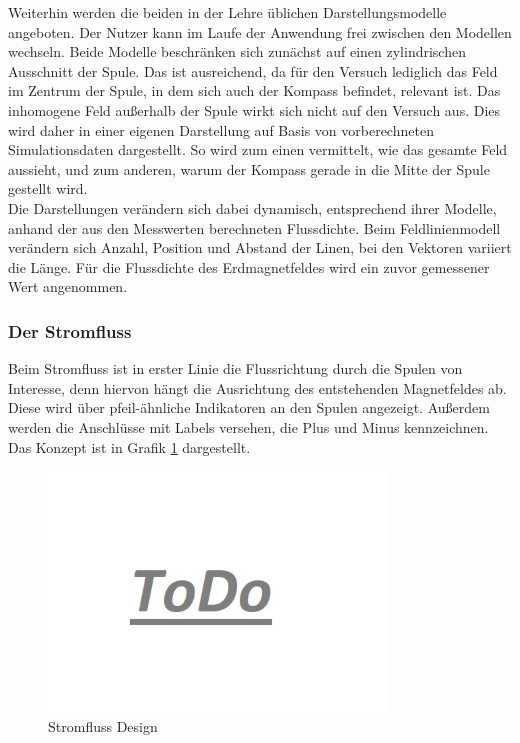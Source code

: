 Weiterhin werden die beiden in der Lehre üblichen Darstellungsmodelle angeboten. Der Nutzer kann im Laufe der Anwendung frei zwischen den Modellen wechseln. Beide Modelle beschränken sich zunächst auf einen zylindrischen Ausschnitt der Spule. Das ist ausreichend, da für den Versuch lediglich das Feld im Zentrum der Spule, in dem sich auch der Kompass befindet, relevant ist. Das inhomogene Feld außerhalb der Spule wirkt sich nicht auf den Versuch aus. Dies wird daher in einer eigenen Darstellung auf Basis von vorberechneten Simulationsdaten dargestellt. So wird zum einen vermittelt, wie das gesamte Feld aussieht, und zum anderen, warum der Kompass gerade in die Mitte der Spule gestellt wird.\\

Die Darstellungen verändern sich dabei dynamisch, entsprechend ihrer Modelle, anhand der aus den Messwerten berechneten Flussdichte. Beim Feldlinienmodell verändern sich Anzahl, Position und Abstand der Linen, bei den Vektoren variiert die Länge. Für die Flussdichte des Erdmagnetfeldes wird ein zuvor gemessener Wert angenommen.\\


\subsubsection{Der Stromfluss} %
Beim Stromfluss ist in erster Linie die Flussrichtung durch die Spulen von Interesse, denn hiervon hängt die Ausrichtung des entstehenden Magnetfeldes ab. Diese wird über pfeil-ähnliche Indikatoren an den Spulen angezeigt. Außerdem werden die Anschlüsse mit Labels versehen, die Plus und Minus kennzeichnen. Das Konzept ist in Grafik \ref{img:current-design} dargestellt.

\begin{figure}[h!]
	\centering
	\includegraphics[width=0.8\textwidth]{images/todo.jpg}
	\caption{Stromfluss Design}
	\label{img:current-design}
\end{figure}


